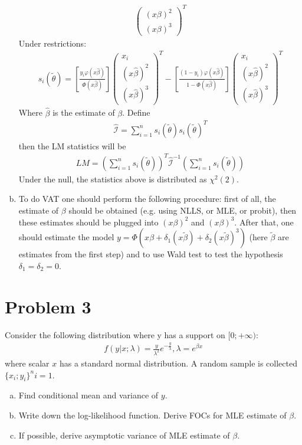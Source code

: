 \documentclass[a4paper]{article}
\newcommand{\summa}{\sum_{i=1}^n}
\begin{document}
\begin{enumerate}[a.]
\begin{align*}
\begin{pmatrix}
		(x \beta)^2\\
		(x \beta)^3
		\end{pmatrix}^T
		\end{align*}
		Under restrictions:
		\begin{align*}
		s_i(\tilde{\theta}) = \left[ \frac{y_i\varphi(x\hat{\beta})}{\Phi(x\hat{\beta})}\right]\begin{pmatrix}
		x_i\\
		(x \hat{\beta})^2\\
		(x \hat{\beta})^3
		\end{pmatrix}^T	- \left[ \frac{(1-y_i)\varphi(x\hat{\beta})}{1 - \Phi(x\hat{\beta})}\right]\begin{pmatrix}
		x_i\\
		(x \hat{\beta})^2\\
		(x \hat{\beta})^3
		\end{pmatrix}^T
		\end{align*} 
		Where $\hat{\beta}$ is the estimate of $\beta$.
		Define 
		\begin{align*}\hat{\mathcal{I}} = \summa s_i(\tilde{\theta}) s_i(\tilde{\theta})^T
		\end{align*}
		then the LM statistics will be
		\begin{align*}
		LM = \left(\summa s_i(\tilde{\theta})\right)^T \hat{\mathcal{I}}^{-1} \left(\summa s_i(\tilde{\theta})\right)
		\end{align*}
		Under the null, the statistics above is distributed as $\chi^2(2)$.
		\item To do VAT one should perform the following procedure: first of all, the estimate of $\beta$ should be obtained (e.g. using NLLS, or MLE, or probit), then these estimates should be plugged into $(x \beta)^2$ and $(x \beta)^3$. After that, one should estimate the model $y = \Phi(x\beta + \delta_1 (x \tilde{\beta}) + \delta_2(x \tilde{\beta})^3)$ (here $\tilde{\beta}$ are estimates from the first step) and to use Wald test to test the hypothesis $\delta_1 = \delta_2 = 0$.
	\end{enumerate}


\section*{Problem 3}
Consider the following distribution where y has a support on $[0; +\infty)$:
\begin{align*}
f(y|x; \lambda) = \frac{y}{\lambda^2} e^{-\frac{y}{\lambda}}, \lambda = e^{ \beta x}
\end{align*}
where scalar $x$ has a standard normal distribution. A random sample is collected $\{x_i; y_i\}^n{i=1}$.
\begin{enumerate}[(a)]
\item Find conditional mean and variance of $y$.
\item Write down the log-likelihood function. Derive FOCs for MLE estimate of $\beta$.
\item If possible, derive asymptotic variance of MLE estimate of $\beta$.
\end{enumerate}
\end{document}

